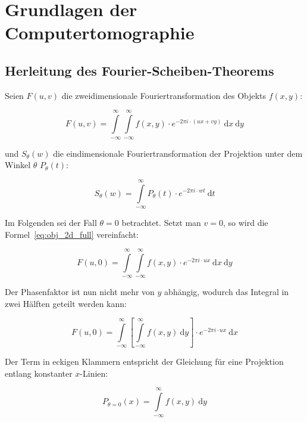 \appendix

\chapter{Grundlagen der Computertomographie}

\section{Herleitung des Fourier-Scheiben-Theorems}\label{app:fourier_scheibe}

Seien $F(u, v)$ die zweidimensionale
Fouriertransformation des Objekts $f(x, y)$:

\begin{equation}\label{eq:obj_2d_full}
    F(u, v) = \int\limits_{-\infty}^{\infty} \int\limits_{-\infty}^{\infty} f(x, y) \cdot e^{-2 \pi i \cdot(u x + v y)}\
        \mathrm{d} x\ \mathrm{d} y
\end{equation}

und $S_{\theta}(w)$ die eindimensionale Fouriertransformation der Projektion unter dem Winkel $\theta$ $P_{\theta}(t)$:

\begin{equation}\label{eq:proj_fft}
    S_{\theta}(w) = \int\limits_{-\infty}^{\infty} P_{\theta}(t) \cdot e^{-2 \pi i \cdot w t}\ \mathrm{d} t
\end{equation}

Im Folgenden sei der Fall $\theta = 0$ betrachtet. Setzt man $v = 0$, so wird die Formel~\ref{eq:obj_2d_full}
vereinfacht:

\begin{equation}
    F(u, 0) = \int\limits_{-\infty}^{\infty} \int\limits_{-\infty}^{\infty} f(x, y) \cdot e^{-2 \pi i \cdot u x}\
    \mathrm{d} x\ \mathrm{d} y
\end{equation}

Der Phasenfaktor ist nun nicht mehr von $y$ abhängig, wodurch das Integral in zwei Hälften geteilt werden kann:

\begin{equation}\label{eq:obj_2d_split}
    F(u, 0) = \int\limits_{-\infty}^{\infty} \left[\int\limits_{-\infty}^{\infty} f(x, y)\ \mathrm{d} y \right] \cdot
    e^{-2 \pi i \cdot u x}\ \mathrm{d} x
\end{equation}

Der Term in eckigen Klammern entspricht der Gleichung für eine Projektion entlang konstanter $x$-Linien:

\begin{equation}
    P_{\theta = 0}(x) = \int\limits_{-\infty}^{\infty} f(x, y)\ \mathrm{d} y
\end{equation}

